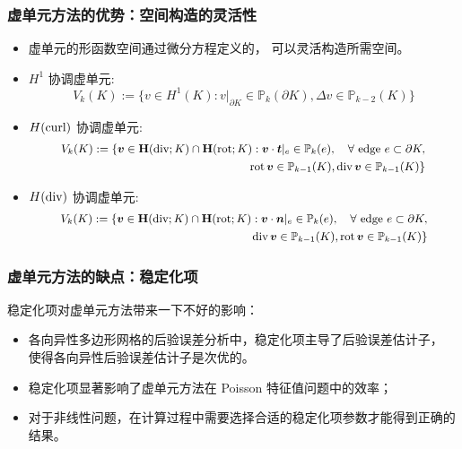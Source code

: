 \documentclass[notheorems,serif]{beamer}
\begin{document}
\begin{frame}
  \frametitle{虚单元方法的优势：空间构造的灵活性}
\begin{itemize}
    \item 虚单元的形函数空间通过微分方程定义的，
        可以灵活构造所需空间。
\end{itemize}
\begin{itemize}
    \item $H^1$ 协调虚单元:
        $$V_k(K) := \{v \in H^1(K): v|_{\partial K} \in \mathbb{P}_k(\partial K),
        \Delta v \in \mathbb{P}_{k-2}(K)\}$$
    \item $H(\operatorname{curl})$ 协调虚单元:
        $$
        \small
        \begin{aligned}
        V_k(K) := \{ \boldsymbol{v} \in
            \mathbf{H}(\mathrm{div}; K) \cap \mathbf{H}(\mathrm{rot}; K) :
            \boldsymbol{v} \cdot \boldsymbol{t}|_e \in \mathbb{P}_k(e), \quad
            \forall \text{ edge } e \subset \partial K, \\ 
            \mathrm{rot} \, \boldsymbol{v} \in \mathbb{P}_{k-1}(K), \mathrm{div}
        \, \boldsymbol{v} \in \mathbb{P}_{k-1}(K) \}
        \end{aligned}
        $$
    \item $H(\mathrm{div})$ 协调虚单元:
        $$
        \small
        \begin{aligned}
        V_k(K) := \{ \boldsymbol{v} \in
            \mathbf{H}(\mathrm{div}; K) \cap \mathbf{H}(\mathrm{rot}; K) :
            \boldsymbol{v} \cdot \boldsymbol{n}|_e \in \mathbb{P}_k(e), \quad
            \forall \text{ edge } e \subset \partial K, \\ 
            \mathrm{div} \, \boldsymbol{v} \in \mathbb{P}_{k-1}(K), 
        \mathrm{rot} \, \boldsymbol{v} \in \mathbb{P}_{k-1}(K)\} 
        \end{aligned}
        $$


\end{itemize}
\end{frame}

\begin{frame}
  \frametitle{虚单元方法的缺点：稳定化项}
  稳定化项对虚单元方法带来一下不好的影响：
  \begin{itemize}
      \item 各向异性多边形网格的后验误差分析中，稳定化项主导了后验误差估计子，
          使得各向异性后验误差估计子是次优的。
      \item 稳定化项显著影响了虚单元方法在 Poisson 特征值问题中的效率；
      \item 对于非线性问题，在计算过程中需要选择合适的稳定化项参数才能得到正确的结果。 
  \end{itemize}

\end{frame}
\end{document}
